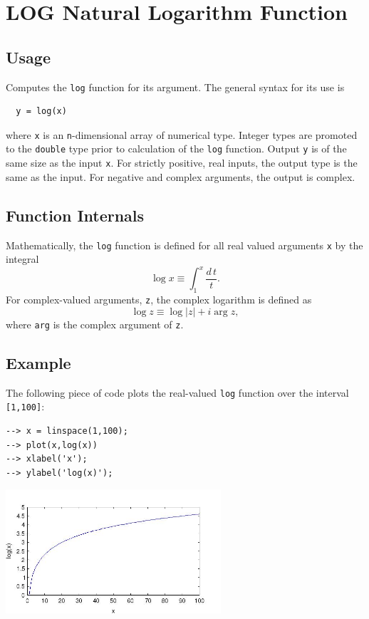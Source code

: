 \section{LOG Natural Logarithm Function}

\subsection{Usage}

Computes the \verb|log| function for its argument.  The general
syntax for its use is
\begin{verbatim}
  y = log(x)
\end{verbatim}
where \verb|x| is an \verb|n|-dimensional array of numerical type.
Integer types are promoted to the \verb|double| type prior to
calculation of the \verb|log| function.  Output \verb|y| is of the
same size as the input \verb|x|. For strictly positive, real inputs, 
the output type is the same as the input.
For negative and complex arguments, the output is complex.
\subsection{Function Internals}

Mathematically, the \verb|log| function is defined for all real
valued arguments \verb|x| by the integral
\[
  \log x \equiv \int_1^{x} \frac{d\,t}{t}.
\]
For complex-valued arguments, \verb|z|, the complex logarithm is
defined as
\[
  \log z \equiv \log |z| + i \arg z,
\]
where \verb|arg| is the complex argument of \verb|z|.
\subsection{Example}

The following piece of code plots the real-valued \verb|log|
function over the interval \verb|[1,100]|:
\begin{verbatim}
--> x = linspace(1,100);
--> plot(x,log(x))
--> xlabel('x');
--> ylabel('log(x)');
\end{verbatim}


\centerline{\includegraphics[width=8cm]{logplot}}

